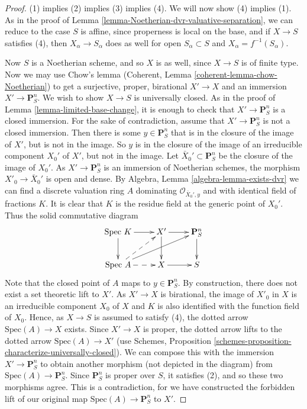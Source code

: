 \begin{proof}
(1) implies (2) implies (3) implies (4).  We will now show (4) implies
(1).  As in the proof of Lemma \ref{lemma-Noetherian-dvr-valuative-separation},
we can reduce to the
case $S$ is affine, since properness is local on the base, and if $X
\to S$ satisfies (4), then $X_\alpha \to S_\alpha$ does as well for
open $S_\alpha \subset S$ and $X_\alpha = f^{-1}(S_\alpha)$.

\medskip\noindent
Now $S$ is a Noetherian scheme, and so $X$ is as well, since $X \to
S$ is of finite type.  Now we may use Chow's lemma
(Coherent, Lemma \ref{coherent-lemma-chow-Noetherian})
to get a surjective, proper, birational
$X' \to X$ and an immersion $X' \to \mathbf{P}^n_S$.  We wish to
show $X \to S$ is universally closed.  As in the proof of Lemma
\ref{lemma-limited-base-change}, it is enough to check that
$X' \to \mathbf{P}^n_S$ is a closed immersion.
For the sake of contradiction, assume that $X' \to
\mathbf{P}^n_S$ is not a closed immersion.  Then there is some $y
\in \mathbf{P}^n_S$ that is in the closure of the image of $X'$, but
is not in the image.  So $y$ is in the closure of the image of an
irreducible component $X_0'$ of $X'$, but not in the image.
Let $\bar X_0' \subset \mathbf{P}^n_S$ be the closure of
the image of $X_0'$. As $X' \to \mathbf{P}^n_S$ is an immersion
of Noetherian schemes, the morphism $X'_0 \to \bar X_0'$ is
open and dense. By Algebra, Lemma \ref{algebra-lemma-exists-dvr} we can find
a discrete valuation ring $A$ dominating
$\mathcal{O}_{\bar X_0', y}$ and with identical field
of fractions $K$. It is clear that
$K$ is the residue field at the generic point of $X_0'$.
Thus the solid commutative diagram
\begin{equation}
\xymatrix{
\text{Spec } K \ar[r] \ar[d] & X' \ar [r] \ar[d] &
\mathbf{P}^n_S \ar[d] \\
\text{Spec } A \ar@{-->}[r] \ar@{-->}[ru] \ar[urr] & X \ar[r] & S\\
}
\end{equation}
Note that the closed point of $A$ maps to $y \in \mathbf{P}^n_S$.  By
construction, there does not exist a set theoretic lift to $X'$.
As $X' \to X$ is birational, the image of $X'_0$ in $X$ is an
irreducible component $X_0$ of $X$ and $K$ is also identified with
the function field of $X_0$. Hence, as $X \to S$ is assumed to satisfy (4),
the dotted arrow $\text{Spec}(A) \to X$ exists.
Since $X' \to X$ is proper, the dotted
arrow lifts to the dotted arrow $\text{Spec}(A) \to X'$ (use Schemes,
Proposition \ref{schemes-proposition-characterize-universally-closed}).
We can compose this with the immersion $X' \to \mathbf{P}^n_S$ to obtain
another morphism (not depicted in the diagram) from
$\text{Spec}(A) \to \mathbf{P}^n_S$.  Since $\mathbf{P}^n_S$
is proper over $S$, it satisfies (2), and so these two morphisms
agree.  This is a contradiction, for we have constructed the
forbidden lift of our original map $\text{Spec}(A) \to \mathbf{P}^n_S$
to $X'$.
\end{proof}





















